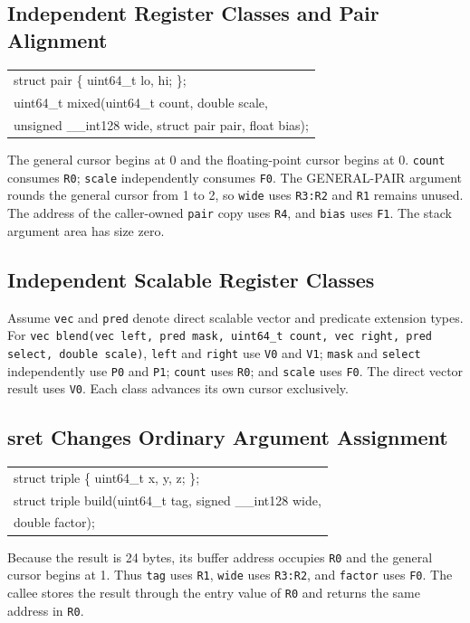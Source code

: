 \documentclass[10pt,twoside]{article}
\begin{document}
\subsection{Independent Register Classes and Pair Alignment}
\begingroup\small\ttfamily
\begin{tabularx}{\linewidth}{@{}X@{}}
struct pair \{ uint64\_t lo, hi; \};\tabularnewline
uint64\_t mixed(uint64\_t count, double scale,\tabularnewline
\hspace{1.2em}unsigned \_\_int128 wide, struct pair pair, float bias);\tabularnewline
\end{tabularx}
\endgroup
The general cursor begins at 0 and the floating-point cursor begins at 0.
\texttt{count} consumes \texttt{R0}; \texttt{scale} independently consumes
\texttt{F0}. The GENERAL-PAIR argument rounds the general cursor from 1 to 2,
so \texttt{wide} uses \texttt{R3:R2} and \texttt{R1} remains unused. The
address of the caller-owned \texttt{pair} copy uses \texttt{R4}, and
\texttt{bias} uses \texttt{F1}. The stack argument area has size zero.

\subsection{Independent Scalable Register Classes}
Assume \texttt{vec} and \texttt{pred} denote direct scalable vector and
predicate extension types. For
\texttt{vec blend(vec left, pred mask, uint64\_t count, vec right, pred
select, double scale)}, \texttt{left} and \texttt{right} use \texttt{V0} and
\texttt{V1}; \texttt{mask} and \texttt{select} independently use \texttt{P0}
and \texttt{P1}; \texttt{count} uses \texttt{R0}; and \texttt{scale} uses
\texttt{F0}. The direct vector result uses \texttt{V0}. Each class advances
its own cursor exclusively.

\subsection{sret Changes Ordinary Argument Assignment}
\begingroup\small\ttfamily
\begin{tabularx}{\linewidth}{@{}X@{}}
struct triple \{ uint64\_t x, y, z; \};\tabularnewline
struct triple build(uint64\_t tag, signed \_\_int128 wide,\tabularnewline
\hspace{1.2em}double factor);\tabularnewline
\end{tabularx}
\endgroup
Because the result is 24 bytes, its buffer address occupies \texttt{R0} and
the general cursor begins at 1. Thus \texttt{tag} uses \texttt{R1},
\texttt{wide} uses \texttt{R3:R2}, and \texttt{factor} uses \texttt{F0}.
The callee stores the result through the entry value of \texttt{R0} and returns
the same address in \texttt{R0}.
\end{document}
